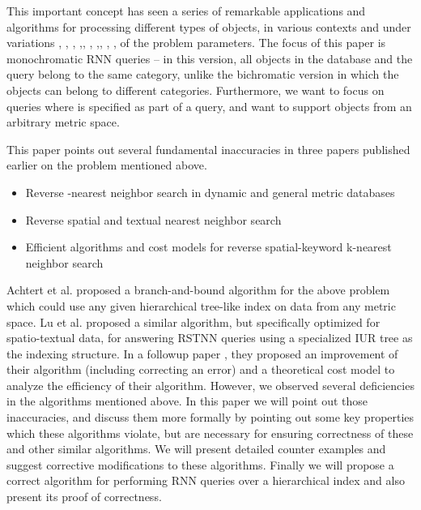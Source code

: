 \documentclass[prodmode,letterpaper]{acmsmall}
\newcommand{\rknn}{RNN\xspace}
\newcommand{\rstknn}{RSTNN\xspace}
\begin{document}
This important concept has seen a series of remarkable applications and
algorithms for processing different types of
objects, in various contexts and under variations \cite{kang2007continuous}, \cite{safar2009voronoi}, \cite{tran2009reverse}, \cite{taniar2011spatial},\cite{shang2011finding}, \cite{cheema2012continuous}, \cite{ghaemi2012continuous},\cite{li2013efficient}, \cite{emrich2014reverse}, \cite{cabello2010facility}, \cite{bhattacharya2013new} of the problem parameters.
The focus of this paper is
monochromatic \rknn queries -- in this version, all objects in
the database and the query belong to the same category, unlike the bichromatic
version in which the objects can belong to different categories. Furthermore, we want to
focus on queries where  is specified as part of a query, and want to support
objects from an arbitrary metric space.

This paper points out several fundamental inaccuracies in three papers published
earlier on the problem mentioned above.
\begin{itemize}
    \item Reverse -nearest neighbor search in dynamic and general metric databases \cite{achtert2009reverse}
    \item Reverse spatial and textual  nearest neighbor search \cite{lu2011reverse}
    \item Efficient algorithms and cost models for reverse spatial-keyword k-nearest neighbor search \cite{lu2014efficient}
\end{itemize}

Achtert et al.\cite{achtert2009reverse} proposed a branch-and-bound algorithm
for the above problem which could use any given hierarchical tree-like index
on data from any metric space. Lu et al. \cite{lu2011reverse} proposed a
similar algorithm, but specifically optimized for spatio-textual data, for answering
\rstknn queries using a specialized IUR tree as the
indexing structure. In a followup paper \cite{lu2014efficient}, they  proposed
an improvement of their algorithm (including correcting an error) and a
theoretical cost model to analyze the efficiency of their algorithm. However,
we observed several deficiencies in the algorithms mentioned above. In this
paper we will point out those inaccuracies, and discuss them more formally by
pointing out some key properties which
these algorithms violate, but are necessary for ensuring correctness of
these and other similar algorithms.  We will present detailed counter examples and suggest corrective
modifications to these algorithms.
Finally we will propose a correct algorithm for performing \rknn queries over a
hierarchical index and also present its proof of correctness.
\end{document}
